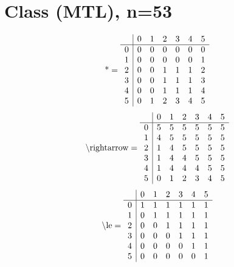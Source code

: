 \documentclass[11pt]{article}
\begin{document}
\section{Class (MTL), n=53}
\[\text{*} = 
\begin{array}{r | r r r r r r}
 & 0 & 1 & 2 & 3 & 4 & 5 \\ \hline
0 & 0 & 0 & 0 & 0 & 0 & 0 \\
1 & 0 & 0 & 0 & 0 & 0 & 1 \\
2 & 0 & 0 & 1 & 1 & 1 & 2 \\
3 & 0 & 0 & 1 & 1 & 1 & 3 \\
4 & 0 & 0 & 1 & 1 & 1 & 4 \\
5 & 0 & 1 & 2 & 3 & 4 & 5 \\
\end{array}
\]
\[\text{\textbackslash rightarrow} = 
\begin{array}{r | r r r r r r}
 & 0 & 1 & 2 & 3 & 4 & 5 \\ \hline
0 & 5 & 5 & 5 & 5 & 5 & 5 \\
1 & 4 & 5 & 5 & 5 & 5 & 5 \\
2 & 1 & 4 & 5 & 5 & 5 & 5 \\
3 & 1 & 4 & 4 & 5 & 5 & 5 \\
4 & 1 & 4 & 4 & 4 & 5 & 5 \\
5 & 0 & 1 & 2 & 3 & 4 & 5 \\
\end{array}
\]
\[\text{\textbackslash le} = 
\begin{array}{r | r r r r r r}
 & 0 & 1 & 2 & 3 & 4 & 5 \\ \hline
0 & 1 & 1 & 1 & 1 & 1 & 1 \\
1 & 0 & 1 & 1 & 1 & 1 & 1 \\
2 & 0 & 0 & 1 & 1 & 1 & 1 \\
3 & 0 & 0 & 0 & 1 & 1 & 1 \\
4 & 0 & 0 & 0 & 0 & 1 & 1 \\
5 & 0 & 0 & 0 & 0 & 0 & 1 \\
\end{array}
\]
\end{document}
